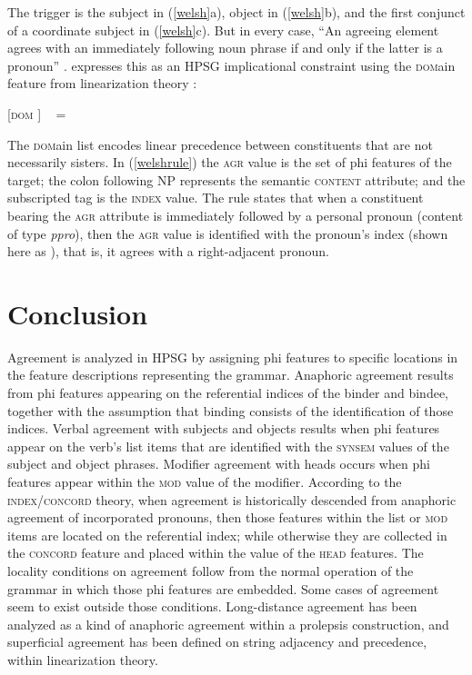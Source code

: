 \documentclass[output=paper
	        ,collection
	        ,collectionchapter
 	        ,biblatex
                ,babelshorthands
                ,newtxmath
                ,draftmode
                ,colorlinks, citecolor=brown
]{langscibook}
\begin{document}
\noindent
The trigger is the subject in (\ref{welsh}a), object in (\ref{welsh}b), and the first conjunct of a coordinate subject in (\ref{welsh}c).  But in every case, ``An agreeing element agrees with an immediately following noun phrase if and only if the latter is a pronoun'' \citep[example\,(48)]{Borsley:2009}. \citet[example\,(99)]{Borsley:2009} expresses this as an HPSG implicational constraint using the \textsc{dom}ain feature from linearization theory \citep{reape:1994,Mueller95c,Mueller99a,Kathol:2000}:

\begin{exe}
\ex \label{welshrule}
{}[\textsc{dom}   ]  %
\impl  \  = 
\end{exe}

\noindent
The \textsc{dom}ain list encodes linear precedence between constituents that are not necessarily sisters.  In (\ref{welshrule}) the \textsc{agr} value is the set of phi features of the target; the colon following NP represents the semantic \textsc{content} attribute; and the subscripted tag  is the \textsc{index} value.  The rule states that when a constituent bearing the \textsc{agr} attribute is immediately followed by a personal pronoun (content of type \textit{ppro}), then the \textsc{agr} value is identified with the pronoun's index (shown here as  ), that is, it agrees with a right-adjacent pronoun.  



\section{Conclusion} 

Agreement is analyzed in HPSG by assigning phi features to specific locations in the feature descriptions representing the grammar.  Anaphoric agreement results from phi features appearing on the referential indices of the binder and bindee, together with the assumption that binding consists of the identification of those indices.  Verbal agreement with subjects and objects results when phi features appear on the verb's \argst list items that are identified with the \textsc{synsem} values of the subject and object phrases.  Modifier agreement with heads occurs when phi features appear within the \textsc{mod} value of the modifier.  According to the \textsc{index}/\textsc{concord} theory, when agreement is historically descended from anaphoric agreement of incorporated pronouns, then those features within the \argst list or \textsc{mod} items are located  on the referential index; while otherwise they are collected in the \textsc{concord} feature and placed within the value of the \textsc{head} features.   The locality conditions on agreement follow from the normal operation of the grammar in which those phi features are embedded.  Some cases of agreement seem to exist outside those conditions.  Long-distance agreement has been analyzed as a kind of anaphoric agreement within a prolepsis construction, and superficial agreement has been defined on string adjacency and precedence, within linearization theory.  
\end{document}
